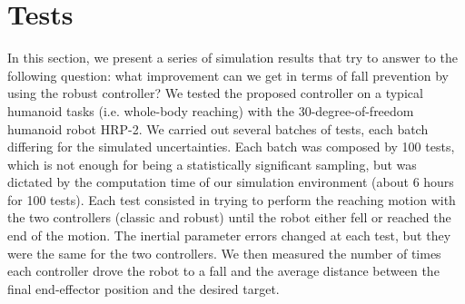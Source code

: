 \section{Tests}
\label{sec:tests}
In this section, we present a series of simulation results that try to answer to the following question: what improvement can we get in terms of fall prevention by using the robust controller?
We tested the proposed controller on a typical humanoid tasks (i.e. whole-body reaching) with the 30-degree-of-freedom humanoid robot HRP-2.
We carried out several batches of tests, each batch differing for the simulated uncertainties. 
Each batch was composed by 100 tests, which is not enough for being a statistically significant sampling, but was dictated by the computation time of our simulation environment (about 6 hours for 100 tests).
Each test consisted in trying to perform the reaching motion with the two controllers (classic and robust) until the robot either fell or reached the end of the motion.
The inertial parameter errors changed at each test, but they were the same for the two controllers.
We then measured the number of times each controller drove the robot to a fall and the average distance between the final end-effector position and the desired target.

